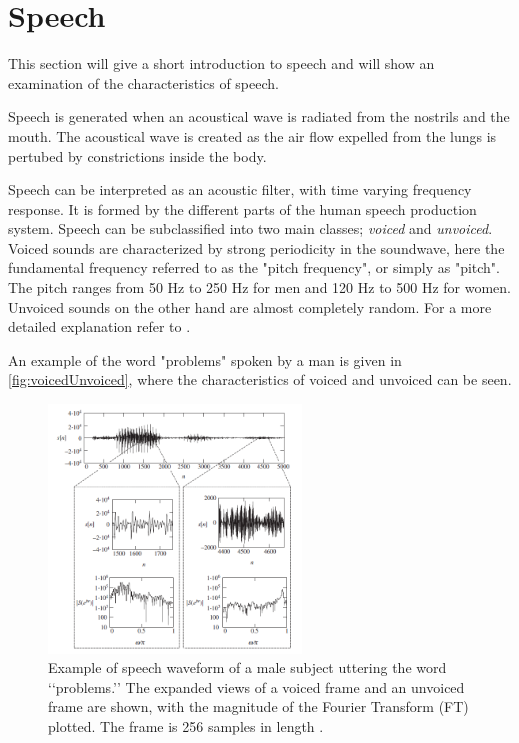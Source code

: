 \section{Speech} \label{sec:Speech}
This section will give a short introduction to speech and will show an examination of the characteristics of speech. 

Speech is generated when an acoustical wave is radiated from the nostrils and the mouth. The acoustical wave is created as the air flow expelled from the lungs is pertubed by constrictions inside the body. 

Speech can be interpreted as an acoustic filter, with time varying frequency response. It is formed by the different parts of the human speech production system. Speech can be subclassified into two main classes; \textit{voiced} and \textit{unvoiced}. Voiced sounds are characterized by strong periodicity in the soundwave, here the fundamental frequency referred  to as the "pitch frequency", or simply as "pitch". The pitch ranges from 50 Hz to 250 Hz for men and 120 Hz to 500 Hz for women. Unvoiced sounds on the other hand are almost completely random. For a more detailed explanation refer to \citep{Speech}. 


An example of the word "problems" spoken by a man is given in \autoref{fig:voicedUnvoiced}, where the characteristics of voiced and unvoiced can be seen. 

\begin{figure}[H]
	\centering
	\includegraphics[width=0.6\textwidth]{figures/Speech/VoicedvsUnvoiced}
	\caption{Example of speech waveform of a male subject uttering the word ‘‘problems.’’ The expanded views of a voiced frame and an unvoiced frame are shown, with the magnitude of the Fourier Transform (FT) plotted. The frame is 256 samples in length \citep{Speech}.}
	\label{fig:voicedUnvoiced}
\end{figure}   

